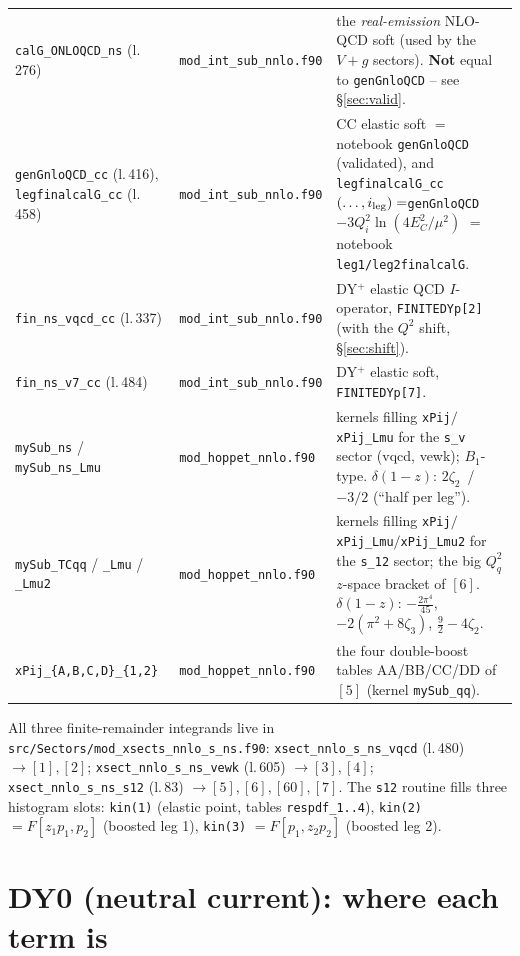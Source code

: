 \documentclass[11pt]{article}
\newcommand{\code}[1]{\texttt{#1}}
\newcommand{\file}[1]{\texttt{#1}}
\newcommand{\zt}{\ensuremath{\zeta_2}}\newcommand{\ztt}{\ensuremath{\zeta_3}}
\begin{document}
\begin{center}
\begin{longtable}{@{}p{4.9cm} p{3.3cm} p{6.6cm}@{}}
\code{calG\_ONLOQCD\_ns} (l.\,276)
 & \file{mod\_int\_sub\_nnlo.f90}
 & the \emph{real-emission} NLO-QCD soft (used by the $V\!+\!g$ sectors).
   \textbf{Not} equal to \code{genGnloQCD} -- see \S\ref{sec:valid}.\\
\code{genGnloQCD\_cc} (l.\,416), \newline \code{legfinalcalG\_cc} (l.\,458)
 & \file{mod\_int\_sub\_nnlo.f90}
 & CC elastic soft $=$ notebook \code{genGnloQCD} (validated), and
   \code{legfinalcalG\_cc}$(\dots,i_{\rm leg})=$\code{genGnloQCD}$-3Q_{i}^2\ln(4E_C^2/\mu^2)$
   $=$ notebook \code{leg1/leg2finalcalG}.\\
\code{fin\_ns\_vqcd\_cc} (l.\,337)
 & \file{mod\_int\_sub\_nnlo.f90}
 & DY${}^+$ elastic QCD $I$-operator, \code{FINITEDYp[2]} (with the $Q^2$ shift, \S\ref{sec:shift}).\\
\code{fin\_ns\_v7\_cc} (l.\,484)
 & \file{mod\_int\_sub\_nnlo.f90}
 & DY${}^+$ elastic soft, \code{FINITEDYp[7]}.\\
\code{mySub\_ns} / \code{mySub\_ns\_Lmu}
 & \file{mod\_hoppet\_nnlo.f90}
 & kernels filling \code{xPij}$/$\code{xPij\_Lmu} for the \code{s\_v} sector (vqcd, vewk);
   $B_1$-type. $\delta(1-z)$: \;$2\zt$ \,/\, $-3/2$ (``half per leg'').\\
\code{mySub\_TCqq} / \code{\_Lmu} / \code{\_Lmu2}
 & \file{mod\_hoppet\_nnlo.f90}
 & kernels filling \code{xPij}$/$\code{xPij\_Lmu}$/$\code{xPij\_Lmu2} for the \code{s\_12} sector;
   the big $Q_q^2$ $z$-space bracket of $[6]$. $\delta(1-z)$: $-\tfrac{2\pi^4}{45}$,
   $-2(\pi^2\!+\!8\ztt)$, $\tfrac92-4\zt$.\\
\code{xPij\_\{A,B,C,D\}\_\{1,2\}}
 & \file{mod\_hoppet\_nnlo.f90}
 & the four double-boost tables AA/BB/CC/DD of $[5]$ (kernel \code{mySub\_qq}).\\
\bottomrule
\end{longtable}
\end{center}

All three finite-remainder integrands live in
\file{src/Sectors/mod\_xsects\_nnlo\_s\_ns.f90}:
\code{xsect\_nnlo\_s\_ns\_vqcd} (l.\,480) $\to[1],[2]$;
\code{xsect\_nnlo\_s\_ns\_vewk} (l.\,605) $\to[3],[4]$;
\code{xsect\_nnlo\_s\_ns\_s12} (l.\,83) $\to[5],[6],[60],[7]$.
The \code{s12} routine fills three histogram slots: \code{kin(1)} (elastic point, tables
\code{respdf\_1..4}), \code{kin(2)} $=F[z_1p_1,p_2]$ (boosted leg 1), \code{kin(3)}
$=F[p_1,z_2p_2]$ (boosted leg 2).

\section{DY0 (neutral current): where each term is}
\label{sec:dy0}
\end{document}
